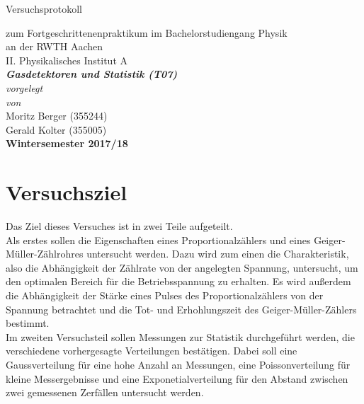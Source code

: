 \documentclass[12pt,a4paper]{article}
\author{Gerald}
\begin{document}
	\setlength{\parindent}{0pt} 
	\begin{center}
		{\LARGE Versuchsprotokoll}\\
		\begin{large}
			zum Fortgeschrittenenpraktikum im Bachelorstudiengang Physik\\[0.4cm]
			an der RWTH Aachen\\
			II. Physikalisches Institut A\\[5.5cm]
			\Large\textbf{\textsl{Gasdetektoren und Statistik (T07)}}\\[5.5cm]
			\normalsize\textit{vorgelegt\\von}\\[0.4cm]
			\large{Moritz Berger (355244)\\Gerald Kolter (355005)}\\[2cm]
			\large \textbf{Wintersemester 2017/18}
		\end{large}
	\end{center}
	\newpage
	
	\tableofcontents
	\newpage
	
	
\section{Versuchsziel}
Das Ziel dieses Versuches ist in zwei Teile aufgeteilt.\\
Als erstes sollen die Eigenschaften eines Proportionalzählers und eines Geiger-Müller-Zählrohres untersucht werden. Dazu wird zum einen die Charakteristik, also die Abhängigkeit der Zählrate von der angelegten Spannung, untersucht, um den optimalen Bereich für die Betriebsspannung zu erhalten. Es wird außerdem die Abhängigkeit der Stärke eines Pulses des Proportionalzählers von der Spannung betrachtet und die Tot- und  Erhohlungszeit des Geiger-Müller-Zählers bestimmt.\\
Im zweiten Versuchsteil sollen Messungen zur Statistik durchgeführt werden, die verschiedene vorhergesagte Verteilungen bestätigen. Dabei soll eine Gaussverteilung für eine hohe Anzahl an Messungen, eine Poissonverteilung für kleine Messergebnisse und eine Exponetialverteilung für den Abstand zwischen zwei gemessenen Zerfällen untersucht werden. 
\end{document}
